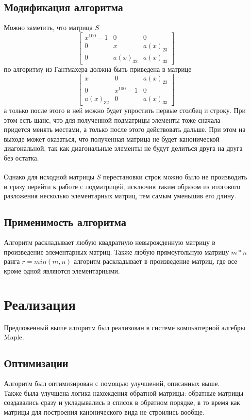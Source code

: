 \documentclass[12pt]{extreport}
\begin{document}
		\section{Модификация алгоритма}
		Можно заметить, что матрица $S$
		\[ 
		\begin{bmatrix}
			x^{100} - 1 & 0 & 0 \\
			0 & x & a(x)_{23} \\
			0 & a(x)_{32} & a(x)_{33}
		\end{bmatrix} 
		\]
		по алгоритму из Гантмахера должна быть приведена в матрице
		\[ 
		\begin{bmatrix}
			x & 0 & a(x)_{23} \\
			0 & x^{100} - 1 & 0 \\
			a(x)_{32} & 0 & a(x)_{33}
		\end{bmatrix} 
		\]
		а только после этого в ней можно будет упростить первые столбец и строку. При 
		этом есть шанс, что для полученной подматрицы элементы тоже сначала придется
		менять местами, а только после этого действовать дальше. При этом на выходе
		может оказаться, что полученная матрица не будет канонической диагональной, так
		как диагональные элементы не будут делиться друга на друга без остатка.\\\\
		Однако для исходной матрицы $S$ перестановки строк можно было не производить
		и сразу перейти к работе с подматрицей, исключив таким образом из итогового
		разложения несколько элементарных матриц, тем самым уменьшив его длину.
		\section{Применимость алгоритма}
			Алгоритм раскладывает любую квадратную невырожденную матрицу в произведение
			элементарных матриц. Также любую прямоугольную матрицу $m*n$ ранга $r=min(m,n)$
			алгоритм раскладывает в произведение матриц, где все кроме одной являются 
			элементарными.
	\chapter{Реализация}
		Предложенный выше алгоритм был реализован в системе компьютерной алгебры Maple.
		\section{Оптимизации}
		Алгоритм был оптимизирован с помощью улучшений, описанных выше.\\
		Также была улучшена логика нахождения обратной матрицы: обратные матрицы
		создавались сразу и укладывались в список в обратном порядке, в то время как
		матрицы для построения канонического вида не строились вообще.
\end{document}
